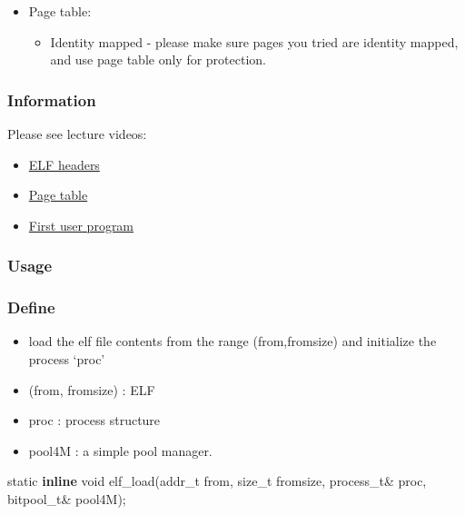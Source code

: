\documentclass[]{book}
\newenvironment{Shaded}{}{}
\newcommand{\KeywordTok}[1]{\textbf{{#1}}}
\newcommand{\DataTypeTok}[1]{\textcolor[rgb]{0.50,0.00,0.00}{{#1}}}
\newcommand{\NormalTok}[1]{{#1}}
\begin{document}
\begin{itemize}
\itemsep1pt\parskip0pt
\item
  Page table:

  \begin{itemize}
  \itemsep1pt\parskip0pt
  \item
    Identity mapped - please make sure pages you tried are identity
    mapped, and use page table only for protection.
  \end{itemize}
\end{itemize}

\subsubsection*{Information}\label{information-9}

Please see lecture videos:

\begin{itemize}
\itemsep1pt\parskip0pt
\item
  \href{}{ELF headers}
\item
  \href{}{Page table}
\item
  \href{}{First user program}
\end{itemize}

\subsubsection*{Usage}\label{usage-9}

\subsubsection*{Define}\label{define-9}

\begin{itemize}
\itemsep1pt\parskip0pt
\item
  load the elf file contents from the range (from,fromsize) and
  initialize the process `proc'
\item
  (from, fromsize) : ELF
\item
  proc : process structure
\item
  pool4M : a simple pool manager.
\end{itemize}

\begin{Shaded}
\begin{Highlighting}[]
\DataTypeTok{static} \KeywordTok{inline} \DataTypeTok{void} \NormalTok{elf_load(addr_t from, size_t fromsize, process_t& proc, bitpool_t& pool4M);}
\end{Highlighting}
\end{Shaded}
\end{document}
